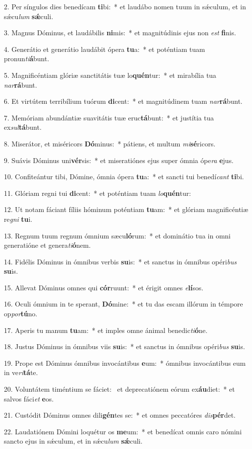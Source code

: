 2. Per síngulos dies benedícam \textbf{ti}bi:~*  et laudábo nomen tuum in sǽculum, et in sǽcu\textit{lum} \textbf{sǽ}culi.\

3. Magnus Dóminus, et laudábilis \textbf{ni}mis:~*  et magnitúdinis ejus non \textit{est} \textbf{fi}nis.\

4. Generátio et generátio laudábit ópera \textbf{tu}a:~*  et poténtiam tuam pronun\textit{ti}\textbf{á}bunt.\

5. Magnificéntiam glóriæ sanctitátis tuæ lo\textbf{quén}tur:~*  et mirabília tua \textit{nar}\textbf{rá}bunt.\

6. Et virtútem terribílium tuórum \textbf{di}cent:~*  et magnitúdinem tuam \textit{nar}\textbf{rá}bunt.\

7. Memóriam abundántiæ suavitátis tuæ eruc\textbf{tá}bunt:~*  et justítia tua ex\textit{sul}\textbf{tá}bunt.\

8. Miserátor, et miséricors \textbf{Dó}minus:~*  pátiens, et multum \textit{mi}\textbf{sé}ricors.\

9. Suávis Dóminus uni\textbf{vér}sis:~*  et miseratiónes ejus super ómnia ópe\textit{ra} \textbf{e}jus.\

10. Confiteántur tibi, Dómine, ómnia ópera \textbf{tu}a:~*  et sancti tui benedí\textit{cant} \textbf{ti}bi.\

11. Glóriam regni tui \textbf{di}cent:~*  et poténtiam tuam \textit{lo}\textbf{quén}tur:\

12. Ut notam fáciant fíliis hóminum poténtiam \textbf{tu}am:~*  et glóriam magnificéntiæ re\textit{gni} \textbf{tu}i.\

13. Regnum tuum regnum ómnium sæcu\textbf{ló}rum:~*  et dominátio tua in omni generatióne et genera\textit{ti}\textbf{ó}nem.\

14. Fidélis Dóminus in ómnibus verbis \textbf{su}is:~*  et sanctus in ómnibus opéri\textit{bus} \textbf{su}is.\

15. Allevat Dóminus omnes qui \textbf{cór}ruunt:~*  et érigit omnes \textit{e}\textbf{lí}sos.\

16. Oculi ómnium in te sperant, \textbf{Dó}mine:~*  et tu das escam illórum in témpore op\textit{por}\textbf{tú}no.\

17. Aperis tu manum \textbf{tu}am:~*  et imples omne ánimal benedic\textit{ti}\textbf{ó}ne.\

18. Justus Dóminus in ómnibus viis \textbf{su}is:~*  et sanctus in ómnibus opéri\textit{bus} \textbf{su}is.\

19. Prope est Dóminus ómnibus invocántibus \textbf{e}um:~*  ómnibus invocántibus eum in ve\textit{ri}\textbf{tá}te.\

20. Voluntátem timéntium se fáciet: \dag\  et deprecatiónem eórum ex\textbf{áu}diet:~*  et salvos fáci\textit{et} \textbf{e}os.\

21. Custódit Dóminus omnes dili\textbf{gén}tes se:~*  et omnes peccatóres \textit{dis}\textbf{pér}det.\

22. Laudatiónem Dómini loquétur os \textbf{me}um:~*  et benedícat omnis caro nómini sancto ejus in sǽculum, et in sǽcu\textit{lum} \textbf{sǽ}culi.\

